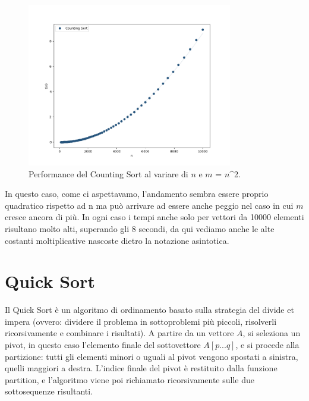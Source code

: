 \documentclass[a4paper, 12pt, oneside]{book}
\begin{document}
\begin{figure}[H]
    \centering
    \includegraphics[width=0.8\textwidth]{images/countingSortQuadratico.png}
    \caption{Performance del Counting Sort al variare di \(n\) e \(m\) = \(n\)^2.}
    \label{fig:counting_sort_m}
\end{figure}

\noindent In questo caso, come ci aspettavamo, l'andamento sembra essere proprio quadratico rispetto ad n ma può arrivare ad essere anche peggio nel caso in cui $m$ cresce ancora di più. In ogni caso i tempi anche solo per vettori da 10000 elementi risultano molto alti, superando gli 8 secondi, da qui vediamo anche le alte costanti moltiplicative nascoste dietro la notazione asintotica.




\chapter{Quick Sort}\label{chap:Quick Sort} %

Il Quick Sort è un algoritmo di ordinamento basato sulla strategia del divide et impera (ovvero: dividere il problema in sottoproblemi più piccoli, risolverli ricorsivamente e combinare i risultati).
A partire da un vettore \(A\), si seleziona un pivot, in questo caso l'elemento finale del sottovettore \(A[p...q]\), e si procede alla partizione: tutti gli elementi minori o uguali al pivot vengono spostati a sinistra, quelli maggiori a destra. L'indice finale del pivot è restituito dalla funzione partition, e l'algoritmo viene poi richiamato ricorsivamente sulle due sottosequenze risultanti.
\end{document}
